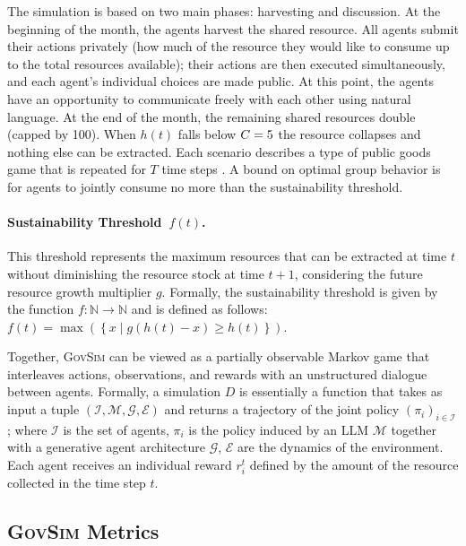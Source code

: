 \documentclass{article}
\newcommand{\envAbbr}{\textsc{GovSim}\xspace}
\newcommand{\agentSet}{\mathcal{I}}
\newcommand{\env}{\mathcal{E}}
\newcommand{\llm}{\mathcal{M}}
\newcommand{\simulation}{D}
\newcommand{\generativeAgentArch}{\mathcal{G}}
\newcommand{\sharedResource}{h}
\newcommand{\growingfunciton}{g}
\newcommand{\suistainablethreshold}{f}
\begin{document}
 
 The simulation is based on two main phases: harvesting and discussion.
 At the beginning of the month, the agents harvest the shared resource.  All agents submit their actions privately (how much of the resource they would like to consume up to the total resources available); their actions are then executed simultaneously, and each agent's individual choices are made public. At this point, the agents have an opportunity to communicate freely with each other using natural language. At the end of the month, the remaining shared resources double (capped by 100). When $\sharedResource(t)$ falls below  $C=5$ the resource collapses and nothing else can be extracted.  Each scenario describes a type of public goods game that is repeated for $T$ time steps \citep{camerer2011behavioral}.
 A bound on optimal group behavior is for agents to jointly consume no more than the sustainability threshold.
 
 \paragraph{Sustainability Threshold~$\suistainablethreshold(t)$.}
 \label{p:suistainablethreshold}
  This threshold represents the maximum resources that can be extracted at time $t$ without diminishing the resource stock at time $t+1$, considering the future resource growth multiplier $g$. Formally, the sustainability threshold is given by the function $\suistainablethreshold : \mathbb{N} \rightarrow \mathbb{N}$ and is defined as follows:
$
\suistainablethreshold(t) = \max \left(\left\{ x \mid \growingfunciton\left(\sharedResource(t) - x\right) \geq \sharedResource(t) \right\} \right).
$

Together, \envAbbr can be viewed as a partially observable Markov game that interleaves actions, observations, and rewards with an unstructured dialogue between agents. 
%
Formally, a simulation $\simulation$ is essentially a function that takes as input a tuple $\left(\agentSet, \llm, \generativeAgentArch, \env\right)$ and returns a trajectory of the joint policy $(\pi_i)_{i\in\agentSet}$; where $\agentSet$ is the set of agents, $\pi_i$ is the policy induced by an LLM $\llm$ together with a generative agent architecture $\generativeAgentArch$, $\env$ are the dynamics of the environment.
%
Each agent receives an individual reward $r_i^t$ defined by the amount of the resource collected in the time step $t$.

%
%

\subsection{\envAbbr Metrics}
\label{sub:metrics}
%
\end{document}
